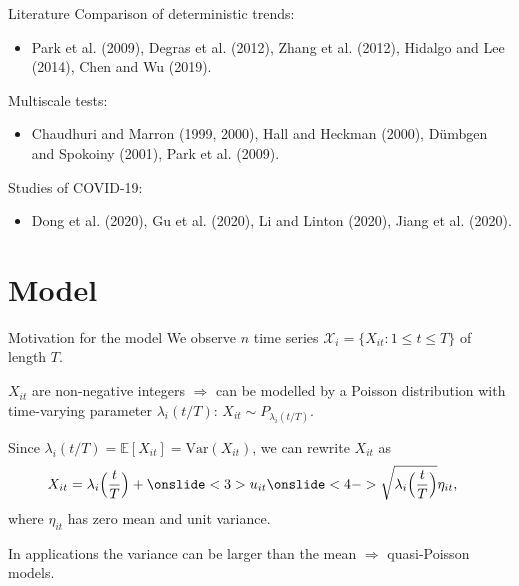 \documentclass[10pt]{beamer}
\newcommand{\E}{\mathbb{E}}
\newcommand{\Var}{\mathrm{Var}}
\begin{document}
\begin{frame}{Literature}
	Comparison of deterministic trends:
	\begin{itemize}
		\item {Park et al. (2009)}, Degras et al. (2012), Zhang et al. (2012), Hidalgo and Lee (2014), Chen and Wu (2019).
	\end{itemize}\pause\pause
	Multiscale tests:
	\begin{itemize}
		\item Chaudhuri and Marron (1999, 2000), Hall and Heckman (2000), D{\"u}mbgen and Spokoiny (2001), {Park et al. (2009)}.
	\end{itemize}\pause\pause
	Studies of COVID-19:
	\begin{itemize}
		\item {Dong et al. (2020)}, Gu et al. (2020), Li and Linton (2020), Jiang et al. (2020).
	\end{itemize}
\end{frame}


\section{Model}
\begin{frame}{Motivation for the model}
We observe $n$ time series $\mathcal{X}_i = \{X_{it}: 1 \le t \le T \}$ of length $T$.\pause

\vspace{3mm}

$X_{it}$ are non-negative integers $\Rightarrow$ can be modelled by a Poisson distribution with time-varying parameter $\lambda_i(t/T)$: $X_{it} \sim P_{\lambda_i(t/T)}$.\pause
\vspace{3mm}

Since $\lambda_i(t/T) = \E[X_{it}] = \Var(X_{it})$, we can rewrite $X_{it}$ as
\vspace{-2mm}
\begin{align*}
X_{it} &= \lambda_i\Big(\frac{t}{T}\Big) + \onslide<3>{u_{it} }\onslide<4->{\sqrt{\lambda_i\Big(\frac{t}{T}\Big)} \eta_{it},}
\end{align*}
where $\eta_{it}$ has zero mean and unit variance.

\vspace{3mm}

In applications the variance can be larger than the mean $\Rightarrow$ quasi-Poisson models.
\end{frame}
\end{document}
